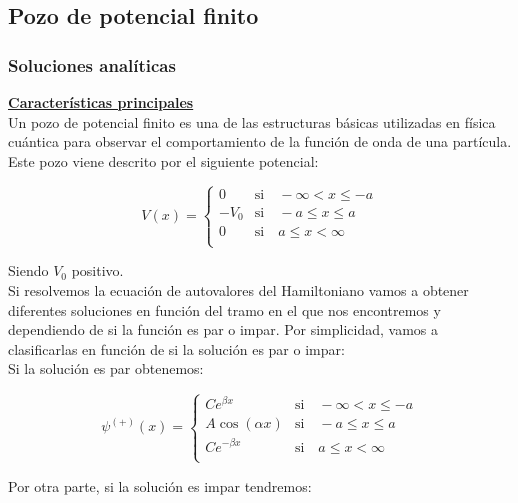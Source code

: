 \documentclass[12pt]{article}
\begin{document}
    \subsection{Pozo de potencial finito}
    
    \subsubsection{Soluciones analíticas}
    
    \textbf{\underline{Características principales}}\\
    
Un pozo de potencial finito es una de las estructuras básicas utilizadas en física cuántica para observar el comportamiento de la función de onda de una partícula. Este pozo viene descrito por el siguiente potencial:

\begin{equation*}
V(x)=\begin{cases} 
    0 & \text{si} \quad -\infty < x \leq -a \\
    -V_0 & \text{si} \quad -a\leq x \leq a \\
    0 & \text{si} \quad a \leq x < \infty \\
 \end{cases}
\end{equation*}

Siendo $V_0$ positivo.\\

Si resolvemos la ecuación de autovalores del Hamiltoniano vamos
a obtener diferentes soluciones en función del tramo en el que 
nos encontremos y dependiendo de si la función es par o impar. Por simplicidad,
vamos a clasificarlas en función de si la solución es par o impar: \\

Si la solución es par obtenemos:

\begin{equation}
    \boxed{\psi^{(+)}(x)=\begin{cases} 
        C e^{\beta x} & \text{si} \quad -\infty < x \leq -a \\
        A\cos(\alpha x) & \text{si} \quad -a\leq x \leq a \\
        C e^{-\beta x} & \text{si} \quad a \leq x < \infty \\
     \end{cases}}
\end{equation}

Por otra parte, si la solución es impar tendremos:
\end{document}
